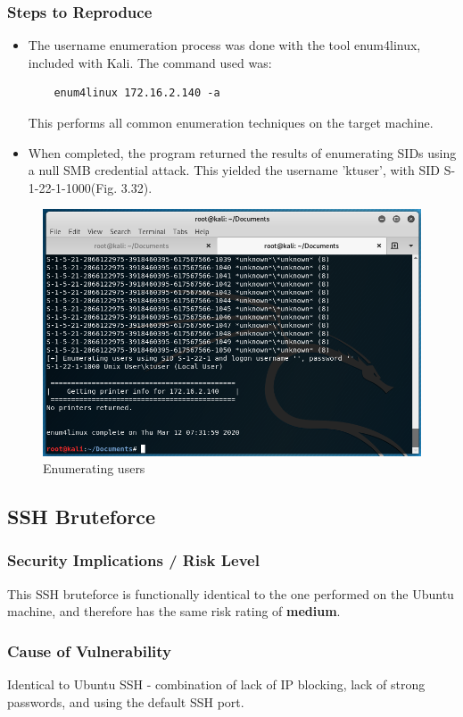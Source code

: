 \documentclass{report}
\begin{document}
\subsubsection{Steps to Reproduce}
\begin{itemize}
	\item The username enumeration process was done with the tool enum4linux, included with Kali. The command used was:
	\begin{verbatim}
	enum4linux 172.16.2.140 -a
	\end{verbatim}
	This performs all common enumeration techniques on the target machine.
	\item When completed, the program returned the results of enumerating SIDs using a null SMB credential attack. This yielded the username 'ktuser', with SID S-1-22-1-1000(Fig. 3.32).
\end{itemize}
\begin{figure}[!htb]
	\centering
	\includegraphics[scale=0.6]{img/userenum1.png}
	\caption{Enumerating users}
\end{figure}

\subsection{SSH Bruteforce}
\subsubsection{Security Implications / Risk Level}
This SSH bruteforce is functionally identical to the one performed on the Ubuntu machine, and therefore has the same risk rating of \textbf{medium}.
\subsubsection{Cause of Vulnerability}
Identical to Ubuntu SSH - combination of lack of IP blocking, lack of strong passwords, and using the default SSH port.
\end{document}
